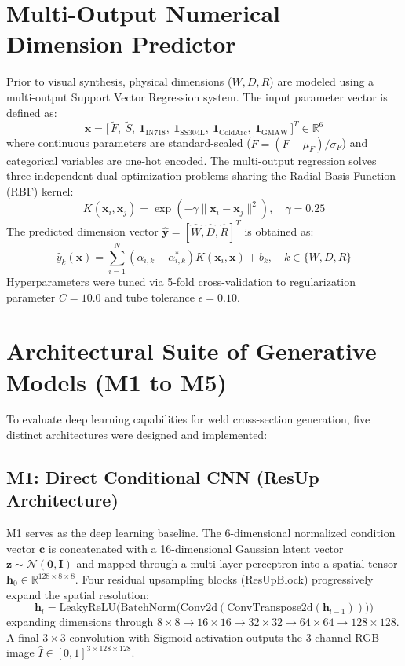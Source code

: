 \documentclass[12pt,a4paper,oneside]{report}
\begin{document}
\section{Multi-Output Numerical Dimension Predictor}
Prior to visual synthesis, physical dimensions ($W, D, R$) are modeled using a multi-output Support Vector Regression system. The input parameter vector is defined as:
\begin{equation}
    \mathbf{x} = \Big[\, \tilde{F},\ \tilde{S},\ \mathbf{1}_{\text{IN718}},\ \mathbf{1}_{\text{SS304L}},\ \mathbf{1}_{\text{ColdArc}},\ \mathbf{1}_{\text{GMAW}} \,\Big]^T \in \mathbb{R}^6
\end{equation}
where continuous parameters are standard-scaled ($\tilde{F} = (F - \mu_F)/\sigma_F$) and categorical variables are one-hot encoded. The multi-output regression solves three independent dual optimization problems sharing the Radial Basis Function (RBF) kernel:
\begin{equation}
    K(\mathbf{x}_i, \mathbf{x}_j) = \exp\left( -\gamma \|\mathbf{x}_i - \mathbf{x}_j\|^2 \right), \quad \gamma = 0.25
\end{equation}
The predicted dimension vector $\hat{\mathbf{y}} = [\hat{W}, \hat{D}, \hat{R}]^T$ is obtained as:
\begin{equation}
    \hat{y}_k(\mathbf{x}) = \sum_{i=1}^{N} (\alpha_{i,k} - \alpha_{i,k}^*) K(\mathbf{x}_i, \mathbf{x}) + b_k, \quad k \in \{W, D, R\}
\end{equation}
Hyperparameters were tuned via 5-fold cross-validation to regularization parameter $C = 10.0$ and tube tolerance $\epsilon = 0.10$.

\section{Architectural Suite of Generative Models (M1 to M5)}
To evaluate deep learning capabilities for weld cross-section generation, five distinct architectures were designed and implemented:

\subsection{M1: Direct Conditional CNN (ResUp Architecture)}
M1 serves as the deep learning baseline. The 6-dimensional normalized condition vector $\mathbf{c}$ is concatenated with a 16-dimensional Gaussian latent vector $\mathbf{z} \sim \mathcal{N}(\mathbf{0}, \mathbf{I})$ and mapped through a multi-layer perceptron into a spatial tensor $\mathbf{h}_0 \in \mathbb{R}^{128 \times 8 \times 8}$. Four residual upsampling blocks (ResUpBlock) progressively expand the spatial resolution:
\begin{equation}
    \mathbf{h}_{l} = \text{LeakyReLU}\Big(\text{BatchNorm}\big(\text{Conv2d}(\text{ConvTranspose2d}(\mathbf{h}_{l-1}))\big)\Big)
\end{equation}
expanding dimensions through $8\times 8 \to 16\times 16 \to 32\times 32 \to 64\times 64 \to 128\times 128$. A final $3\times 3$ convolution with Sigmoid activation outputs the 3-channel RGB image $\hat{I} \in [0, 1]^{3 \times 128 \times 128}$.
\end{document}

